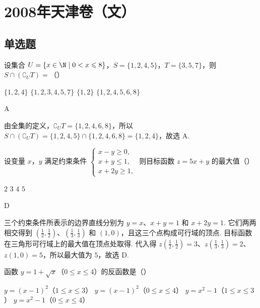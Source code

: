 \chapter{2008年天津卷（文）}

\section{单选题}

\begin{problem}
设集合 \(U = \{x \in \N \mid 0 < x \leqslant 8\}\)，\(S = \{1, 2, 4, 5\}\)，\(T = \{3, 5, 7\}\)，则 \(S \cap (\complement_U T) =\)（\quad）

\choices
    {\(\{1,2,4\}\)}
    {\(\{1,2,3,4,5,7\}\)}
    {\(\{1,2\}\)}
    {\(\{1,2,4,5,6,8\}\)}
\end{problem}

\begin{answer}
A
\end{answer}

\begin{solution}
由全集的定义，\(\complement_U T=\{1,2,4,6,8\}\)，所以
\(S\cap(\complement_U T)=\{1,2,4,5\}\cap\{1,2,4,6,8\}=\{1,2,4\}\)，故选 A.
\end{solution}

\begin{problem}
设变量 \(x\)，\(y\) 满足约束条件 \(\begin{cases}
x - y \geqslant 0,\\
x + y \leqslant 1,\\
x + 2y \geqslant 1,
\end{cases}\) 则目标函数 \(z = 5x + y\) 的最大值（\quad）

\choices
    {\(2\)}
    {\(3\)}
    {\(4\)}
    {\(5\)}
\end{problem}

\begin{answer}
D
\end{answer}

\begin{solution}
三个约束条件所表示的边界直线分别为 \(y=x\)、\(x+y=1\) 和 \(x+2y=1\). 它们两两相交得到
\(\left(\frac{1}{2},\frac{1}{2}\right)\)、\(\left(\frac{1}{3},\frac{1}{3}\right)\) 和 \((1,0)\)，且这三个点构成可行域的顶点. 目标函数在三角形可行域上的最大值在顶点处取得. 代入得
\(z\left(\frac{1}{2},\frac{1}{2}\right)=3\)、\(z\left(\frac{1}{3},\frac{1}{3}\right)=2\)、\(z(1,0)=5\)，所以最大值为 \(5\)，故选 D.
\end{solution}

\begin{problem}
函数 \( y = 1 + \sqrt{x} \)（\(0 \leqslant x \leqslant 4\)）的反函数是（\quad）

\choices
    {\( y = (x - 1)^{2} \)（\(1 \leqslant x \leqslant 3\)）}
    {\( y = (x - 1)^{2} \)（\(0 \leqslant x \leqslant 4\)）}
    {\( y = x^{2} - 1 \)（\(1 \leqslant x \leqslant 3\)）}
    {\( y = x^{2} - 1 \)（\(0 \leqslant x \leqslant 4\)）}
\end{problem}


